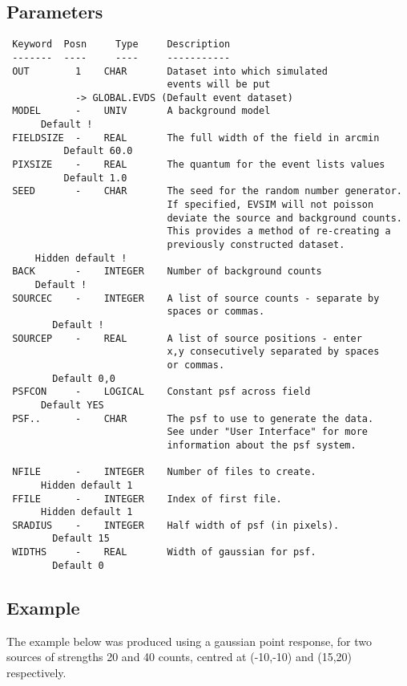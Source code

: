 \documentclass{book}
\renewcommand{\_}{{\tt\char'137}}     %
\begin{document}
\subsection{Parameters}
\begin{verbatim}
 Keyword  Posn     Type     Description
 -------  ----     ----     -----------
 OUT        1    CHAR       Dataset into which simulated
                            events will be put
            -> GLOBAL.EVDS (Default event dataset)
 MODEL      -    UNIV       A background model
      Default !
 FIELDSIZE  -    REAL       The full width of the field in arcmin
          Default 60.0
 PIXSIZE    -    REAL       The quantum for the event lists values
          Default 1.0
 SEED       -    CHAR       The seed for the random number generator.
                            If specified, EVSIM will not poisson
                            deviate the source and background counts.
                            This provides a method of re-creating a
                            previously constructed dataset.
     Hidden default !
 BACK       -    INTEGER    Number of background counts
     Default !
 SOURCEC    -    INTEGER    A list of source counts - separate by
                            spaces or commas.
        Default !
 SOURCEP    -    REAL       A list of source positions - enter
                            x,y consecutively separated by spaces
                            or commas.
        Default 0,0
 PSFCON     -    LOGICAL    Constant psf across field
      Default YES
 PSF..      -    CHAR       The psf to use to generate the data.
                            See under "User Interface" for more
                            information about the psf system.

 NFILE      -    INTEGER    Number of files to create.
      Hidden default 1
 FFILE      -    INTEGER    Index of first file.
      Hidden default 1
 SRADIUS    -    INTEGER    Half width of psf (in pixels).
        Default 15
 WIDTHS     -    REAL       Width of gaussian for psf.
        Default 0

\end{verbatim}\subsection{Example}
The example below was produced using a gaussian point response,
for two sources of strengths 20 and 40 counts, centred at (-10,-10)
and (15,20) respectively.
\end{document}
